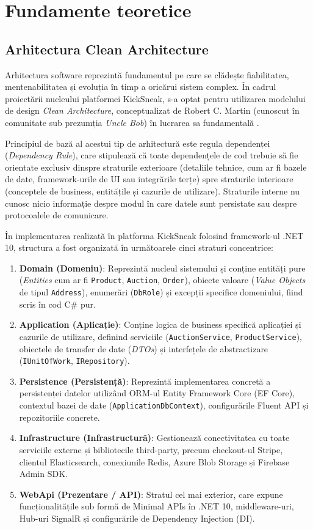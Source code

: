 \chapter{Fundamente teoretice}

\section{Arhitectura Clean Architecture}

Arhitectura software reprezintă fundamentul pe care se clădește fiabilitatea, mentenabilitatea și evoluția în timp a oricărui sistem complex. În cadrul proiectării nucleului platformei KickSneak, s-a optat pentru utilizarea modelului de design \textit{Clean Architecture}, conceptualizat de Robert C. Martin (cunoscut în comunitate sub prezumția \textit{Uncle Bob}) în lucrarea sa fundamentală \cite{martin2017clean}.

Principiul de bază al acestui tip de arhitectură este regula dependenței (\textit{Dependency Rule}), care stipulează că toate dependențele de cod trebuie să fie orientate exclusiv dinspre straturile exterioare (detaliile tehnice, cum ar fi bazele de date, framework-urile de UI sau integrările terțe) spre straturile interioare (conceptele de business, entitățile și cazurile de utilizare). Straturile interne nu cunosc nicio informație despre modul în care datele sunt persistate sau despre protocoalele de comunicare.

În implementarea realizată în platforma KickSneak folosind framework-ul .NET 10, structura a fost organizată în următoarele cinci straturi concentrice:
\begin{enumerate}
    \item \textbf{Domain (Domeniu)}: Reprezintă nucleul sistemului și conține entități pure (\textit{Entities} cum ar fi \texttt{Product}, \texttt{Auction}, \texttt{Order}), obiecte valoare (\textit{Value Objects} de tipul \texttt{Address}), enumerări (\texttt{DbRole}) și excepții specifice domeniului, fiind scris în cod C\# pur.
    \item \textbf{Application (Aplicație)}: Conține logica de business specifică aplicației și cazurile de utilizare, definind serviciile (\texttt{AuctionService}, \texttt{ProductService}), obiectele de transfer de date (\textit{DTOs}) și interfețele de abstractizare (\texttt{IUnitOfWork}, \texttt{IRepository}).
    \item \textbf{Persistence (Persistență)}: Reprezintă implementarea concretă a persistenței datelor utilizând ORM-ul Entity Framework Core (EF Core), contextul bazei de date (\texttt{ApplicationDbContext}), configurările Fluent API și repozitoriile concrete.
    \item \textbf{Infrastructure (Infrastructură)}: Gestionează conectivitatea cu toate serviciile externe și bibliotecile third-party, precum checkout-ul Stripe, clientul Elasticsearch, conexiunile Redis, Azure Blob Storage și Firebase Admin SDK.
    \item \textbf{WebApi (Prezentare / API)}: Stratul cel mai exterior, care expune funcționalitățile sub formă de Minimal APIs în .NET 10, middleware-uri, Hub-uri SignalR și configurările de Dependency Injection (DI).
\end{enumerate}

